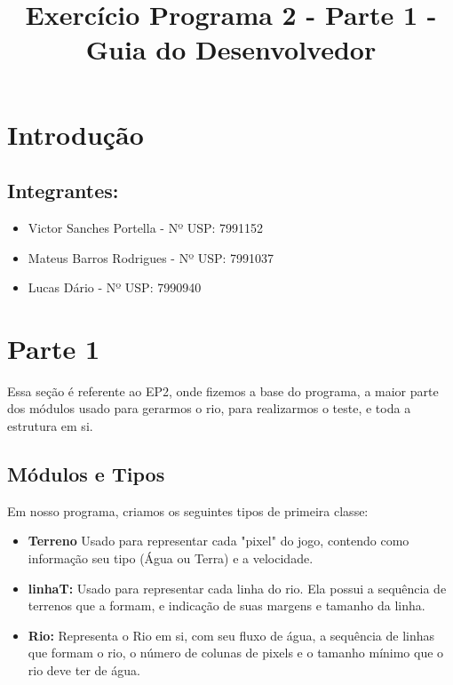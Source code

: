 \documentclass[11pt]{article}
\title{Exercício Programa 2 - Parte 1 - Guia do Desenvolvedor}
\begin{document}
\maketitle

\section{Introduç\~ao}

\begin{flushleft}
\subsection*{Integrantes:} 

\begin{itemize}
\item Victor Sanches Portella -  Nº USP: 7991152
\item Mateus Barros Rodrigues -  Nº USP: 7991037
\item Lucas Dário  -  Nº USP: 7990940
\end{itemize}



\section{Parte 1}

Essa seção é referente ao EP2, onde fizemos a base do programa, a maior parte dos módulos usado para gerarmos o rio, para realizarmos o teste, e toda a estrutura em si. 

\subsection{Módulos e Tipos}

Em nosso programa, criamos os seguintes tipos de primeira classe:
\begin{itemize}

\item \textbf{Terreno} Usado para representar cada "pixel"
 do jogo, contendo como informação seu tipo (Água ou Terra) e
a velocidade.

\item \textbf{linhaT:} Usado para representar cada linha do
rio. Ela possui a sequência de terrenos que a formam, e indicação
de suas margens e tamanho da linha. 

\item \textbf{Rio:} Representa o Rio em si, com seu fluxo de água,
a sequência de linhas que formam o rio, o número de colunas de pixels
e o tamanho mínimo que o rio deve ter de água.


\end{itemize}
\end{flushleft}
\end{document}
